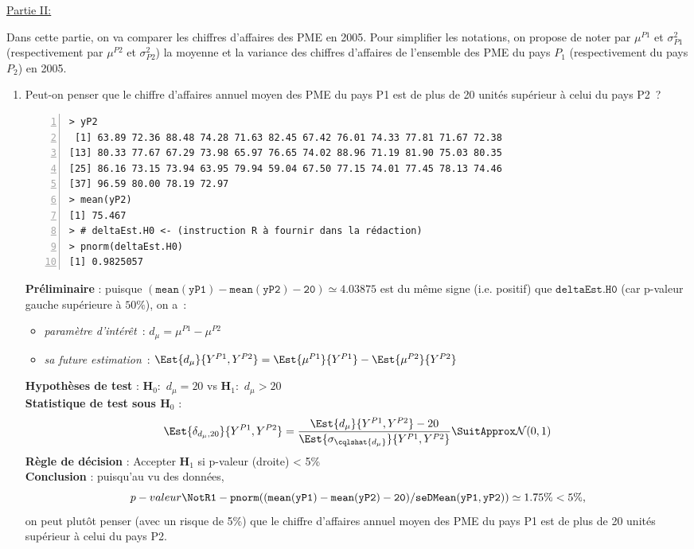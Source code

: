 \documentclass[10pt]{report}
\begin{document}
\begin{exercice}
\begin{enumerate}
\end{enumerate}


\noindent \underline{Partie II:}

Dans cette partie, on va comparer les chiffres d'affaires des PME en 2005. Pour simplifier les notations, on propose de noter par $\mu^{P1}$ et $\sigma^2_{P1}$ (respectivement par $\mu^{P2}$ et $\sigma^2_{P2}$) la moyenne et la variance des chiffres d'affaires de l'ensemble des PME du pays $P_1$ (respectivement du pays $P_2$) en 2005.

\begin{enumerate}
\item Peut-on penser que le chiffre d'affaires annuel moyen des PME du pays P1 est de plus de 20 unités supérieur à celui du pays P2~?

\IndicR
\begin{Verbatim}[frame=leftline,fontfamily=tt,fontshape=n,numbers=left]
> yP2
 [1] 63.89 72.36 88.48 74.28 71.63 82.45 67.42 76.01 74.33 77.81 71.67 72.38
[13] 80.33 77.67 67.29 73.98 65.97 76.65 74.02 88.96 71.19 81.90 75.03 80.35
[25] 86.16 73.15 73.94 63.95 79.94 59.04 67.50 77.15 74.01 77.45 78.13 74.46
[37] 96.59 80.00 78.19 72.97
> mean(yP2)
[1] 75.467
> # deltaEst.H0 <- (instruction R à fournir dans la rédaction)
> pnorm(deltaEst.H0)
[1] 0.9825057
\end{Verbatim}

 

\begin{Correction}
\noindent \textbf{Préliminaire} : puisque $\mathtt{(mean(yP1)-mean(yP2)-20)}\simeq4.03875$ est du même signe (i.e. positif) que $\mathtt{deltaEst.H0}$ (car p-valeur gauche supérieure à $50\%$), on a~: 
      \begin{itemize}
\item \textit{paramètre d'intérêt}~: $d_\mu=\mu^{P1}-\mu^{P2}$
\item \textit{sa future estimation}~: $\Est{d_\mu}{Y^{P1},Y^{P2}}=\Est{\mu^{P1}}{Y^{P1}}-\Est{\mu^{P2}}{Y^{P2}}$
\end{itemize}
\noindent \textbf{Hypothèses de test} : $\mathbf{H}_0:$ $d_\mu=20$ vs {\large $\mathbf{H}_1:$ $d_\mu>20$}\\
\textbf{Statistique de test sous $\mathbf{H}_0$} :
  $$
  \Est{\delta_{d_\mu,20}}{Y^{P1},Y^{P2}}= {\displaystyle \frac{\Est{d_\mu}{Y^{P1},Y^{P2}}-20}{
\Est{\sigma_{\cqlshat{d_\mu}}}{Y^{P1},Y^{P2}}
}} 
  \SuitApprox \mathcal{N}(0,1)
  $$
\textbf{Règle de décision} : Accepter $\mathbf{H}_1$ si 
  p-valeur (droite) < 5\%\\
\noindent \textbf{Conclusion} :
puisqu'au vu des données, 
  \[
p-valeur\NotR\mathtt{1-pnorm((mean(yP1)-mean(yP2)-20)/seDMean(yP1,yP2))} \simeq 1.75\% < 5\%,
\]
on peut plutôt penser (avec un risque de 5\%) que le chiffre d'affaires annuel moyen des PME du pays P1 est de plus de 20 unités supérieur à celui du pays P2.
\end{Correction}





\end{enumerate}
\end{exercice}
\end{document}
